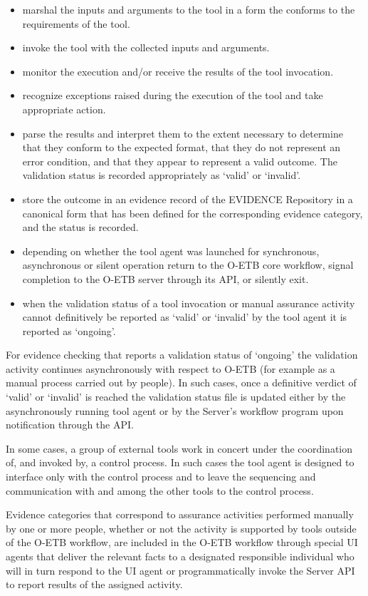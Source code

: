 \documentclass[12pt,twoside,a4paper]{article}
\begin{document}
\begin{itemize}
\item
  marshal the inputs and arguments to the tool in a form the conforms to the requirements of the tool.
\item
  invoke the tool with the collected inputs and arguments.
\item
  monitor the execution and/or receive the results of the tool invocation.
\item
  recognize exceptions raised during the execution of the tool and take appropriate action.
\item
  parse the results and interpret them to the extent necessary to determine that they conform to the expected format, that they do not represent an error condition, and that they appear to represent a valid outcome. The validation status is recorded appropriately as `valid' or `invalid'.
\item
  store the outcome in an evidence record of the EVIDENCE Repository in a canonical form that has been defined for the corresponding evidence category, and the status is recorded.
\item
  depending on whether the tool agent was launched for synchronous, asynchronous or silent operation return to the O-ETB core workflow, signal completion to the O-ETB server through its API, or silently exit.
\item
  when the validation status of a tool invocation or manual assurance activity cannot definitively be reported as `valid' or `invalid' by the tool agent it is reported as `ongoing'.
\end{itemize}

For evidence checking that reports a validation status of `ongoing' the validation activity continues asynchronously with respect to O-ETB (for example as a manual process carried out by people). In such cases, once a definitive verdict of `valid' or `invalid' is reached the validation status file is updated either by the asynchronously running tool agent or by the Server's workflow program upon notification through the API.

In some cases, a group of external tools work in concert under the coordination of, and invoked by, a control process. In such cases the tool agent is designed to interface only with the control process and to leave the sequencing and communication with and among the other tools to the control process.

Evidence categories that correspond to assurance activities performed manually by one or more people, whether or not the activity is supported by tools outside of the O-ETB workflow, are included in the O-ETB workflow through special UI agents that deliver the relevant facts to a designated responsible individual who will in turn respond to the UI agent or programmatically invoke the Server API to report results of the assigned activity.
\end{document}
